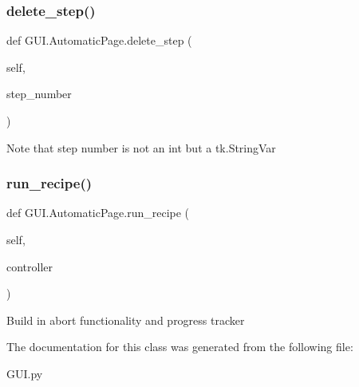 \subsubsection{\texorpdfstring{delete\_step()}{delete\_step()}}
{\footnotesize\ttfamily def G\+U\+I.\+Automatic\+Page.\+delete\+\_\+step (\begin{DoxyParamCaption}\item[{}]{self,  }\item[{}]{step\+\_\+number }\end{DoxyParamCaption})}

\begin{DoxyVerb}Note that step number is not an int but a tk.StringVar
\end{DoxyVerb}
 \mbox{\label{class_g_u_i_1_1_automatic_page_a583b326d8206caf80794251790de6ded}} 
\subsubsection{\texorpdfstring{run\_recipe()}{run\_recipe()}}
{\footnotesize\ttfamily def G\+U\+I.\+Automatic\+Page.\+run\+\_\+recipe (\begin{DoxyParamCaption}\item[{}]{self,  }\item[{}]{controller }\end{DoxyParamCaption})}

\begin{DoxyVerb}Build in abort functionality and progress tracker
\end{DoxyVerb}
 

The documentation for this class was generated from the following file\+:\begin{DoxyCompactItemize}
\item 
G\+U\+I.\+py\end{DoxyCompactItemize}
